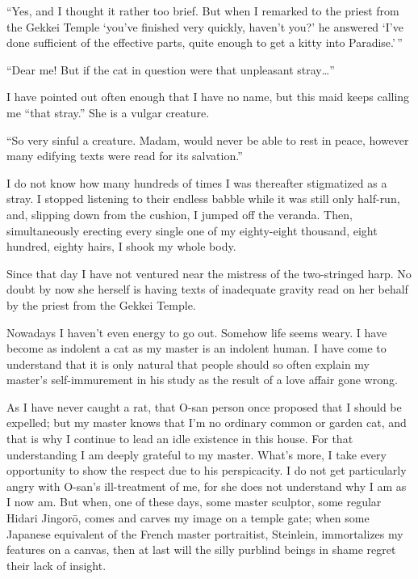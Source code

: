 \documentclass[12pt, openright]{book}
\begin{document}
``Yes, and I thought it rather too brief. But when I remarked to the
priest from the Gekkei Temple `you've finished very quickly, haven't
you?' he answered `I've done sufficient of the effective parts, quite
enough to get a kitty into Paradise.'\,''

``Dear me! But if the cat in question were that unpleasant
stray\ldots{}''

I have pointed out often enough that I have no name, but this maid keeps
calling me ``that stray.'' She is a vulgar creature.

``So very sinful a creature. Madam, would never be able to rest in
peace, however many edifying texts were read for its salvation.''

I do not know how many hundreds of times I was thereafter stigmatized as
a stray. I stopped listening to their endless babble while it was still
only half-run, and, slipping down from the cushion, I jumped off the
veranda. Then, simultaneously erecting every single one of my
eighty-eight thousand, eight hundred, eighty hairs, I shook my whole
body.

Since that day I have not ventured near the mistress of the two-stringed
harp. No doubt by now she herself is having texts of inadequate gravity
read on her behalf by the priest from the Gekkei Temple.

Nowadays I haven't even energy to go out. Somehow life seems weary. I
have become as indolent a cat as my master is an indolent human. I have
come to understand that it is only natural that people should so often
explain my master's self-immurement in his study as the result of a love
affair gone wrong.

As I have never caught a rat, that O-san person once proposed that I
should be expelled; but my master knows that I'm no ordinary common or
garden cat, and that is why I continue to lead an idle existence in this
house. For that understanding I am deeply grateful to my master. What's
more, I take every opportunity to show the respect due to his
perspicacity. I do not get particularly angry with O-san's ill-treatment
of me, for she does not understand why I am as I now am. But when, one
of these days, some master sculptor, some regular Hidari Jingorō, comes
and carves my image on a temple gate; when some Japanese equivalent of
the French master portraitist, Steinlein, immortalizes my features on a
canvas, then at last will the silly purblind beings in shame regret
their lack of insight.
\end{document}
